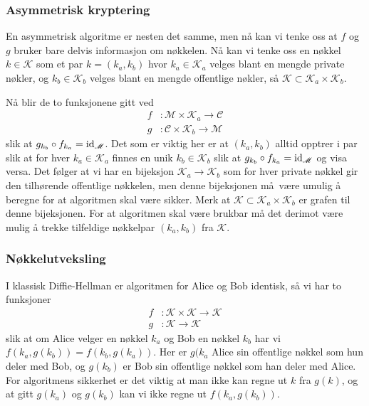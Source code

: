 \subsubsection{Asymmetrisk kryptering}
En asymmetrisk algoritme er nesten  det samme,
men nå kan vi tenke oss at $f$ og $g$ bruker
bare delvis informasjon om nøkkelen.
Nå kan vi tenke oss en nøkkel $k\in\mathscr K$ som et par
$k = (k_a, k_b)$ hvor $k_a\in \mathscr K_a$ velges blant
en mengde private nøkler,
og $k_b\in \mathscr K_b$ velges blant en mengde offentlige nøkler,
så $\mathscr K\subset \mathscr K_a\times\mathscr K_b$.

Nå blir de to funksjonene gitt ved
\[\begin{aligned}
    f&\colon\mathscr M\times \mathscr K_a\to \mathscr C\\
    g&\colon\mathscr C\times \mathscr K_b\to \mathscr M
\end{aligned}\]
slik at $g_{k_b}\circ f_{k_a} = \operatorname{id}_{\mathscr M}$.
Det som er viktig her er at $(k_a, k_b)$ alltid opptrer i par
slik at for hver $k_a\in\mathscr K_a$ finnes en unik $k_b\in\mathscr K_b$
slik at $g_{k_b}\circ f_{k_a} = \operatorname{id}_{\mathscr M}$ og visa versa.
Det følger at vi har en bijeksjon $\mathscr K_a\to\mathscr K_b$
som for hver private nøkkel gir den tilhørende offentlige nøkkelen,
men denne bijeksjonen må være umulig å beregne for at algoritmen skal være sikker.
Merk at $\mathcal K\subset \mathcal K_a\times \mathcal K_b$ er grafen til denne bijeksjonen.
For at algoritmen skal være brukbar må det derimot være mulig å trekke tilfeldige
nøkkelpar $(k_a, k_b)$ fra $\mathcal K$.

\subsubsection{Nøkkelutveksling}
I klassisk Diffie-Hellman er algoritmen for Alice og Bob identisk,
så vi har to funksjoner
\[\begin{aligned}
    f&\colon \mathscr K\times\mathscr K\to \mathscr K
    \\
    g&\colon \mathscr K\to \mathscr K
\end{aligned}\]
slik at om Alice velger en nøkkel $k_a$ og Bob en nøkkel $k_b$
har vi $f(k_a, g(k_b)) = f(k_b, g(k_a))$.
Her er $g(k_a$ Alice sin offentlige nøkkel som hun deler med Bob,
og $g(k_b)$ er Bob sin offentlige nøkkel som han deler med Alice.
For algoritmens sikkerhet er det viktig at man ikke kan regne ut
$k$ fra $g(k)$, og at gitt $g(k_a)$ og $g(k_b)$
kan vi ikke regne ut $f(k_a, g(k_b))$.
